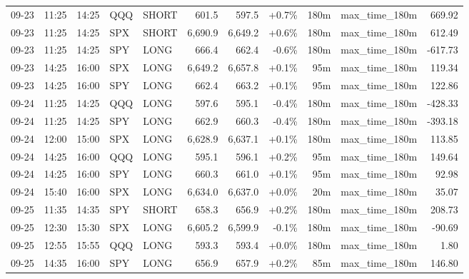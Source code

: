 \documentclass[11pt,a4paper,twoside]{article}
\begin{document}
\begin{center}
\begin{longtable}{>{\color{txtmain}}l l l l l r r r r >{\color{txtmain}}l r}
09-23 & 11:25 & 14:25 & QQQ & SHORT & 601.5 & 597.5 & \textcolor{wingreen}{+0.7\%} & 180m & max\_time\_180m & \textcolor{wingreen}{669.92} \\
09-23 & 11:25 & 14:25 & SPX & SHORT & 6,690.9 & 6,649.2 & \textcolor{wingreen}{+0.6\%} & 180m & max\_time\_180m & \textcolor{wingreen}{612.49} \\
09-23 & 11:25 & 14:25 & SPY & LONG & 666.4 & 662.4 & \textcolor{lossred}{-0.6\%} & 180m & max\_time\_180m & \textcolor{lossred}{-617.73} \\
09-23 & 14:25 & 16:00 & SPX & LONG & 6,649.2 & 6,657.8 & \textcolor{wingreen}{+0.1\%} & 95m & max\_time\_180m & \textcolor{wingreen}{119.34} \\
09-23 & 14:25 & 16:00 & SPY & LONG & 662.4 & 663.2 & \textcolor{wingreen}{+0.1\%} & 95m & max\_time\_180m & \textcolor{wingreen}{122.86} \\
09-24 & 11:25 & 14:25 & QQQ & LONG & 597.6 & 595.1 & \textcolor{lossred}{-0.4\%} & 180m & max\_time\_180m & \textcolor{lossred}{-428.33} \\
09-24 & 11:25 & 14:25 & SPY & LONG & 662.9 & 660.3 & \textcolor{lossred}{-0.4\%} & 180m & max\_time\_180m & \textcolor{lossred}{-393.18} \\
09-24 & 12:00 & 15:00 & SPX & LONG & 6,628.9 & 6,637.1 & \textcolor{wingreen}{+0.1\%} & 180m & max\_time\_180m & \textcolor{wingreen}{113.85} \\
09-24 & 14:25 & 16:00 & QQQ & LONG & 595.1 & 596.1 & \textcolor{wingreen}{+0.2\%} & 95m & max\_time\_180m & \textcolor{wingreen}{149.64} \\
09-24 & 14:25 & 16:00 & SPY & LONG & 660.3 & 661.0 & \textcolor{wingreen}{+0.1\%} & 95m & max\_time\_180m & \textcolor{wingreen}{92.98} \\
09-24 & 15:40 & 16:00 & SPX & LONG & 6,634.0 & 6,637.0 & \textcolor{wingreen}{+0.0\%} & 20m & max\_time\_180m & \textcolor{wingreen}{35.07} \\
09-25 & 11:35 & 14:35 & SPY & SHORT & 658.3 & 656.9 & \textcolor{wingreen}{+0.2\%} & 180m & max\_time\_180m & \textcolor{wingreen}{208.73} \\
09-25 & 12:30 & 15:30 & SPX & LONG & 6,605.2 & 6,599.9 & \textcolor{lossred}{-0.1\%} & 180m & max\_time\_180m & \textcolor{lossred}{-90.69} \\
09-25 & 12:55 & 15:55 & QQQ & LONG & 593.3 & 593.4 & \textcolor{wingreen}{+0.0\%} & 180m & max\_time\_180m & \textcolor{wingreen}{1.80} \\
09-25 & 14:35 & 16:00 & SPY & LONG & 656.9 & 657.9 & \textcolor{wingreen}{+0.2\%} & 85m & max\_time\_180m & \textcolor{wingreen}{146.80} \\

\end{longtable}
\end{center}
\end{document}
